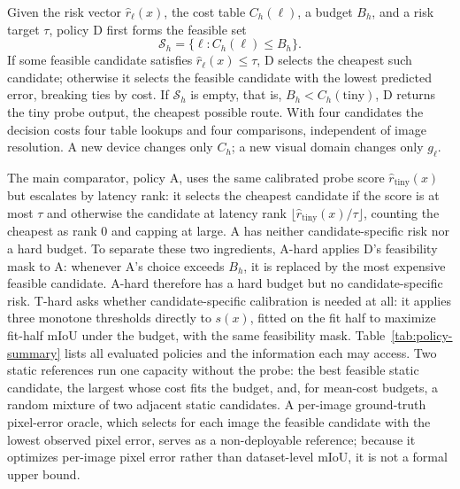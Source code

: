 \documentclass[a4paper,5p]{elsarticle}
\newcommand{\miou}{mIoU}
\begin{document}
Given the risk vector $\widehat{r}_\ell(x)$, the cost table $C_h(\ell)$, a budget $B_h$, and a risk target $\tau$, policy D first forms the feasible set
\begin{equation}
\mathcal{S}_h=\{\ell : C_h(\ell)\leq B_h\}.
\label{eq:feasible}
\end{equation}
If some feasible candidate satisfies $\widehat{r}_\ell(x)\leq\tau$, D selects the cheapest such candidate; otherwise it selects the feasible candidate with the lowest predicted error, breaking ties by cost. If $\mathcal{S}_h$ is empty, that is, $B_h<C_h(\mathrm{tiny})$, D returns the tiny probe output, the cheapest possible route. With four candidates the decision costs four table lookups and four comparisons, independent of image resolution. A new device changes only $C_h$; a new visual domain changes only $g_\ell$.

The main comparator, policy A, uses the same calibrated probe score $\widehat{r}_{\mathrm{tiny}}(x)$ but escalates by latency rank: it selects the cheapest candidate if the score is at most $\tau$ and otherwise the candidate at latency rank $\lfloor \widehat{r}_{\mathrm{tiny}}(x)/\tau\rfloor$, counting the cheapest as rank 0 and capping at large. A has neither candidate-specific risk nor a hard budget. To separate these two ingredients, A-hard applies D's feasibility mask to A: whenever A's choice exceeds $B_h$, it is replaced by the most expensive feasible candidate. A-hard therefore has a hard budget but no candidate-specific risk. T-hard asks whether candidate-specific calibration is needed at all: it applies three monotone thresholds directly to $s(x)$, fitted on the fit half to maximize fit-half \miou{} under the budget, with the same feasibility mask. Table~\ref{tab:policy-summary} lists all evaluated policies and the information each may access. Two static references run one capacity without the probe: the best feasible static candidate, the largest whose cost fits the budget, and, for mean-cost budgets, a random mixture of two adjacent static candidates. A per-image ground-truth pixel-error oracle, which selects for each image the feasible candidate with the lowest observed pixel error, serves as a non-deployable reference; because it optimizes per-image pixel error rather than dataset-level \miou{}, it is not a formal upper bound.
\end{document}
